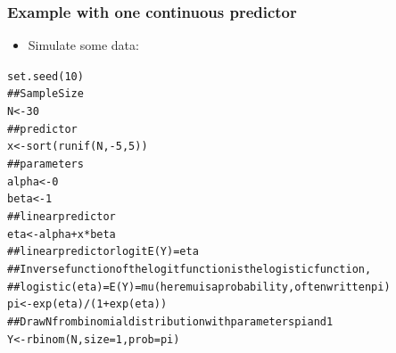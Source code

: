 \documentclass[extsize,handout,10pt]{beamer}\usepackage[]{graphicx}\usepackage[]{color}
\makeatletter
\newcommand{\hlnum}[1]{\textcolor[rgb]{0.502,0.086,1}{#1}}%
\newcommand{\hlcom}[1]{\textcolor[rgb]{1,0.251,0.502}{#1}}%
\newcommand{\hlopt}[1]{\textcolor[rgb]{0.251,0.251,0.251}{#1}}%
\newcommand{\hlstd}[1]{\textcolor[rgb]{0.251,0.251,0.251}{#1}}%
\newcommand{\hlkwb}[1]{\textcolor[rgb]{0,0.439,0.902}{#1}}%
\newcommand{\hlkwc}[1]{\textcolor[rgb]{0.188,0.941,0.314}{#1}}%
\newcommand{\hlkwd}[1]{\textcolor[rgb]{0.69,0.188,0.941}{#1}}%
\newenvironment{kframe}{%
 \def\at@end@of@kframe{}%
 \ifinner\ifhmode%
  \def\at@end@of@kframe{\end{minipage}}%
  \begin{minipage}{\columnwidth}%
 \fi\fi%
 \def\FrameCommand##1{\hskip\@totalleftmargin \hskip-\fboxsep
 \colorbox{shadecolor}{##1}\hskip-\fboxsep
     \hskip-\linewidth \hskip-\@totalleftmargin \hskip\columnwidth}%
 \MakeFramed {\advance\hsize-\width
   \@totalleftmargin\z@ \linewidth\hsize
   \@setminipage}}%
 {\par\unskip\endMakeFramed%
 \at@end@of@kframe}
\newenvironment{knitrout}{}{} %
\makeatother
\begin{document}
\begin{frame}[fragile]
  \frametitle{Example with one continuous predictor}

  \begin{itemize}
  \item Simulate some data:
  \end{itemize}

\begin{knitrout}\tiny
{}\color{fgcolor}\begin{kframe}
\begin{alltt}
\hlkwd{set.seed}\hlstd{(}\hlnum{10}\hlstd{)}
\hlcom{##Sample Size}
\hlstd{N}\hlkwb{<-}\hlnum{30}
\hlcom{##predictor}
\hlstd{x}\hlkwb{<-}\hlkwd{sort}\hlstd{(}\hlkwd{runif}\hlstd{(N,}\hlopt{-}\hlnum{5}\hlstd{,}\hlnum{5}\hlstd{))}
\hlcom{##parameters}
\hlstd{alpha}\hlkwb{<-}\hlnum{0}
\hlstd{beta}\hlkwb{<-}\hlnum{1}
\hlcom{##linear predictor}
\hlstd{eta}\hlkwb{<-}\hlstd{alpha}\hlopt{+}\hlstd{x}\hlopt{*}\hlstd{beta}
\hlcom{##linear predictor logit E(Y) = eta}
\hlcom{##Inverse function of the logit function is the logistic function,}
\hlcom{##logistic(eta)=E(Y)=mu (here mu is a probability, often written pi)}
\hlstd{pi}\hlkwb{<-}\hlkwd{exp}\hlstd{(eta)}\hlopt{/}\hlstd{(}\hlnum{1}\hlopt{+}\hlkwd{exp}\hlstd{(eta))}
\hlcom{##Draw N from binomial distribution with parameters pi and 1}
\hlstd{Y}\hlkwb{<-}\hlkwd{rbinom}\hlstd{(N,}\hlkwc{size}\hlstd{=}\hlnum{1}\hlstd{,}\hlkwc{prob}\hlstd{=pi)}
\end{alltt}
\end{kframe}
\end{knitrout}

\end{frame}
\end{document}
